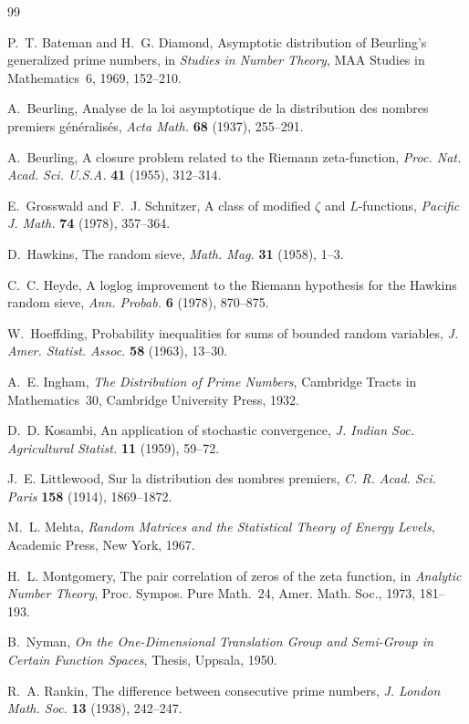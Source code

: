 \documentclass[12pt,letterpaper]{article}
\theoremstyle{definition}
\theoremstyle{remark}
\numberwithin{equation}{section}
\begin{document}
\begin{thebibliography}{99}

 P.~T. Bateman and H.~G. Diamond, Asymptotic distribution
of Beurling's generalized prime numbers, in \emph{Studies in Number
Theory}, MAA Studies in Mathematics~6, 1969, 152--210.

 A.~Beurling, Analyse de la loi asymptotique de la
distribution des nombres premiers g\'en\'eralis\'es, \emph{Acta Math.}
\textbf{68} (1937), 255--291.

 A.~Beurling, A closure problem related to the Riemann
zeta-function, \emph{Proc. Nat. Acad. Sci. U.S.A.} \textbf{41} (1955),
312--314.

 E.~Grosswald and F.~J. Schnitzer, A class of modified
$\zeta$ and $L$-functions, \emph{Pacific J. Math.} \textbf{74} (1978),
357--364.

 D.~Hawkins, The random sieve, \emph{Math. Mag.}
\textbf{31} (1958), 1--3.

 C.~C. Heyde, A loglog improvement to the Riemann
hypothesis for the Hawkins random sieve, \emph{Ann. Probab.} \textbf{6}
(1978), 870--875.

 W.~Hoeffding, Probability inequalities for sums of
bounded random variables, \emph{J. Amer. Statist. Assoc.} \textbf{58}
(1963), 13--30.

 A.~E. Ingham, \emph{The Distribution of Prime Numbers},
Cambridge Tracts in Mathematics~30, Cambridge University Press, 1932.

 D.~D. Kosambi, An application of stochastic
convergence, \emph{J. Indian Soc. Agricultural Statist.} \textbf{11}
(1959), 59--72.

 J.~E. Littlewood, Sur la distribution des nombres
premiers, \emph{C. R. Acad. Sci. Paris} \textbf{158} (1914), 1869--1872.

 M.~L. Mehta, \emph{Random Matrices and the Statistical
Theory of Energy Levels}, Academic Press, New York, 1967.

 H.~L. Montgomery, The pair correlation of zeros of
the zeta function, in \emph{Analytic Number Theory}, Proc. Sympos. Pure
Math.~24, Amer. Math. Soc., 1973, 181--193.

 B.~Nyman, \emph{On the One-Dimensional Translation Group
and Semi-Group in Certain Function Spaces}, Thesis, Uppsala, 1950.

 R.~A. Rankin, The difference between consecutive prime
numbers, \emph{J. London Math. Soc.} \textbf{13} (1938), 242--247.


\end{thebibliography}
\end{document}
